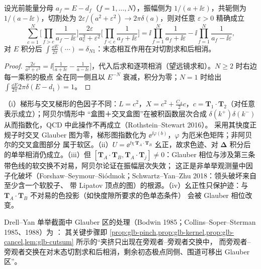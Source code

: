 \begin{lemma}\label{lem:glb-cutsum}
设光前能量分母 $a_f=E-d_f$（$f=1,\dots,N$），振幅侧为 $1/(a+\ii\varepsilon)$，共轭侧为 $1/(a-\ii\varepsilon)$，切割处为
$2\varepsilon/(a^2+\varepsilon^2)\to2\pi\delta(a)$，则对任意 $\varepsilon>0$ 精确成立
\begin{equation}\label{eq:glb-cutsum}
\sum_{c=1}^N\Big[\prod_{f>c}\frac1{a_f-\ii\varepsilon}\Big]\frac{2\varepsilon}{a_c^2+\varepsilon^2}\Big[\prod_{f<c}\frac1{a_f+\ii\varepsilon}\Big]
=\ii\prod_{f=1}^N\frac1{a_f+\ii\varepsilon}-\ii\prod_{f=1}^N\frac1{a_f-\ii\varepsilon},
\end{equation}
对 $E$ 积分后 $\int\frac{\dd E}{2\pi}(\cdots)=\delta_{N1}$：末态相互作用在对切割求和后相消。
\end{lemma}
\begin{proof}
$\frac{2\varepsilon}{a^2+\varepsilon^2}=\ii\big[\frac1{a+\ii\varepsilon}-\frac1{a-\ii\varepsilon}\big]$，代入后求和逐项相消（望远镜求和）。$N\ge2$ 时右边每一乘积的极点
全在同一侧且以 $E^{-N}$ 衰减，积分为零；$N=1$ 时给出 $\int\frac{\dd E}{2\pi}2\pi\delta(E-d_1)=1$。
\end{proof}

\begin{remark}[双胶子与非阿贝尔交换]
（i）梯形与交叉梯形的色因子不同：$L=c^2$，$X=c^2+\tfrac{C_A}{2}c$，$c=\bm T_1\!\cdot\!\bm T_2$（对任意表示成立）；阿贝尔情形中
“盒图＋交叉盒图”在被积函数层次合成 $\delta(k^+)\delta(k^-)$ 从而指数化，QCD 中此操作不再成立（Rothstein--Stewart 2016）。
采用其快度正规子时交叉 Glauber 图为零，梯形图指数化为 $\ee^{\ii\varphi(b)}$，$\varphi$ 为厄米色矩阵；非阿贝尔的交叉盒图部分
属于软区。（ii）$U=\ee^{\ii\chi\,\bm T_A\cdot\bm T_B}$ 幺正，故求色迹、对 $\bm\Delta$ 积分后的单举相消仍成立。（iii）但
$[\bm T_A\!\cdot\!\bm T_B,\bm T_A\!\cdot\!\bm T_j]\neq0$：Glauber 相位与涉及第三条带色线的软交换不对易，阿贝尔论证在振幅层次失效；
这正是非单举观测量中因子化破坏（Forshaw--Seymour--Siódmok；Schwartz--Yan--Zhu 2018：领头破坏来自至少含一个软胶子、
带 Lipatov 顶点的图）的根源。（iv）幺正性只保护迹：与 $\bm T_A\!\cdot\!\bm T_B$ 不对易的色投影（如快度隙所要求的色单态条件）
会被 Glauber 相位改变。
\end{remark}

Drell--Yan 单举截面中 Glauber 区的处理（Bodwin 1985；Collins--Soper--Sterman 1985、1988）为 \tagA：
其关键步骤即 \cref{prop:glb-pinch,prop:glb-kernel,prop:glb-cancel,lem:glb-cutsum} 所示的“夹挤只出现在旁观者–旁观者交换中，
而旁观者–旁观者交换在对末态切割求和后相消，剩余初态极点同侧、围道可移出 Glauber 区”。

